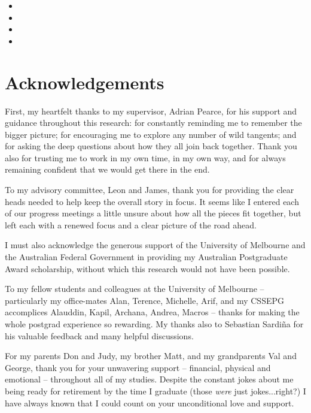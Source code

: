 \nobibliography*
\begin{itemize}
\item {}
\item {}
\item {}
\item {}
\end{itemize}


\chapter*{Acknowledgements} 

First, my heartfelt thanks to my supervisor, Adrian Pearce, for his support
and guidance throughout this research: for constantly reminding me to remember
the bigger picture; for encouraging me to explore any number of wild tangents; 
and for asking the deep questions about how they all join back together.
Thank you also for trusting me to work in my own time, in my own way, and for
always remaining confident that we would get there in the end.

To my advisory committee, Leon and James, thank you for providing the
clear heads needed to help keep the overall story in focus.  It seems like I
entered each of our progress meetings a little unsure about how all the pieces fit together, but left each with a renewed focus and a clear picture of the road ahead.

I must also acknowledge the generous support of the University of Melbourne
and the Australian Federal Government in providing my Australian Postgraduate
Award scholarship, without which this research would not have been possible.

To my fellow students and colleagues at the University of Melbourne -- particularly my office-mates Alan, Terence, Michelle, Arif, and my CSSEPG accomplices Alauddin, Kapil, Archana, Andrea, Macros -- thanks for making the whole postgrad
experience so rewarding. My thanks also to Sebastian Sardi\~na for his valuable feedback and many helpful discussions.

For my parents Don and Judy, my brother Matt, and my grandparents Val and
George, thank you for your unwavering support -- financial, physical and emotional -- throughout all of my studies.  Despite the constant jokes about me being ready
for retirement by the time I graduate (those \emph{were} just jokes...right?) I
have always known that I could count on your unconditional love and support.

